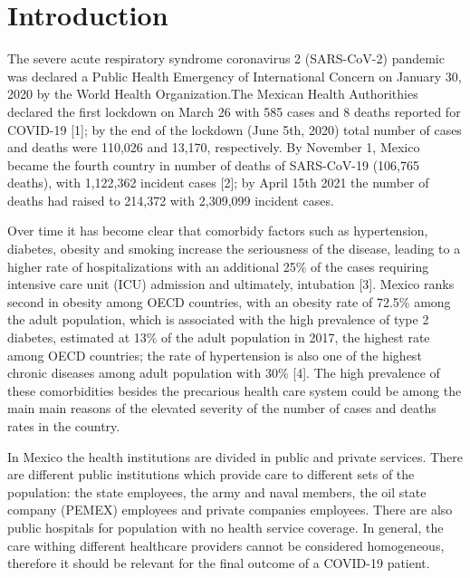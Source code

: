 \documentclass[10pt,letterpaper]{article}
\begin{document}
\linenumbers

\newcommand{\N}{\mathbb{N}}
\newcommand{\Z}{\mathbb{Z}}
\newcommand{\R}{\mathbb{R}}
\newcommand{\Q}{\mathbb{Q}}
\newcommand{\vac}{\varnothing}
\newcommand{\Pro}{\mathbb{P}}
\newcommand{\var}{\text{Var}}
\newcommand{\E}{\mathbb{E}}

\section{Introduction}\label{introduction}

The severe acute respiratory syndrome coronavirus 2 (SARS-CoV-2)
pandemic was declared a Public Health Emergency of International Concern
on January 30, 2020 by the World Health Organization.The Mexican Health
Authorithies declared the first lockdown on March 26 with 585 cases and
8 deaths reported for COVID-19 {[}1{]}; by the end of the lockdown (June
5th, 2020) total number of cases and deaths were 110,026 and 13,170,
respectively. By November 1, Mexico became the fourth country in number
of deaths of SARS-CoV-19 (106,765 deaths), with 1,122,362 incident cases
{[}2{]}; by April 15th 2021 the number of deaths had raised to 214,372
with 2,309,099 incident cases.

Over time it has become clear that comorbidy factors such as
hypertension, diabetes, obesity and smoking increase the seriousness of
the disease, leading to a higher rate of hospitalizations with an
additional 25\% of the cases requiring intensive care unit (ICU)
admission and ultimately, intubation {[}3{]}. Mexico ranks second in
obesity among OECD countries, with an obesity rate of 72.5\% among the
adult population, which is associated with the high prevalence of type 2
diabetes, estimated at 13\% of the adult population in 2017, the highest
rate among OECD countries; the rate of hypertension is also one of the
highest chronic diseases among adult population with 30\% {[}4{]}. The
high prevalence of these comorbidities besides the precarious health
care system could be among the main main reasons of the elevated
severity of the number of cases and deaths rates in the country.

In Mexico the health institutions are divided in public and private
services. There are different public institutions which provide care to
different sets of the population: the state employees, the army and
naval members, the oil state company (PEMEX) employees and private
companies employees. There are also public hospitals for population with
no health service coverage. In general, the care withing different
healthcare providers cannot be considered homogeneous, therefore it
should be relevant for the final outcome of a COVID-19 patient.
\end{document}

